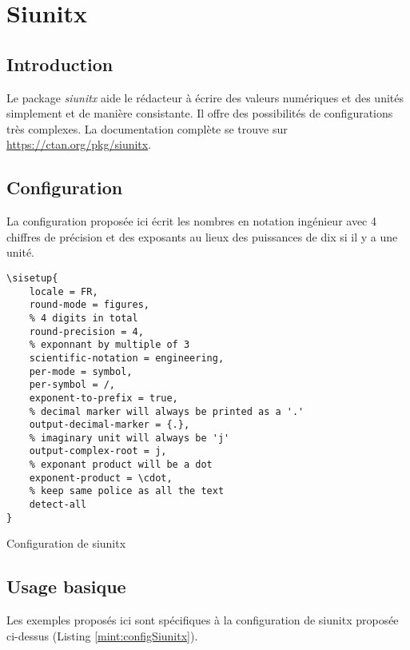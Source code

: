 \section{Siunitx}
\subsection{Introduction}
Le package \emph{siunitx} aide le rédacteur à écrire des valeurs numériques et des unités simplement et de manière consistante.
Il offre des possibilités de configurations très complexes.
La documentation complète se trouve sur \url{https://ctan.org/pkg/siunitx}.

\subsection{Configuration}
La configuration proposée ici écrit les nombres en notation ingénieur avec 4 chiffres de précision et des exposants au lieux des puissances de dix si il y a une unité.

\begin{listing}[H]
	\begin{verbatim}
\sisetup{
	locale = FR,
	round-mode = figures,
	% 4 digits in total
	round-precision = 4,
	% exponnant by multiple of 3
	scientific-notation = engineering,
	per-mode = symbol,
	per-symbol = /,
	exponent-to-prefix = true,
	% decimal marker will always be printed as a '.'
	output-decimal-marker = {.},		
	% imaginary unit will always be 'j'
	output-complex-root = j,			
	% exponant product will be a dot
	exponent-product = \cdot,			
	% keep same police as all the text
	detect-all							
}
	\end{verbatim}
	\caption{Configuration de siunitx}
	\label{mint:configSiunitx}
\end{listing}


\subsection{Usage basique}
Les exemples proposés ici sont spécifiques à la configuration de siunitx proposée ci-dessus (Listing \ref{mint:configSiunitx}).

